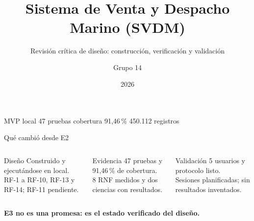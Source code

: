 \documentclass[aspectratio=169,10pt]{beamer}
\title[SVDM -- E3]{Sistema de Venta y Despacho Marino (SVDM)}
\subtitle{Revisión crítica de diseño: construcción, verificación y validación}
\author{Grupo 14}
\institute{Universidad de Concepción}
\date{2026}
\begin{document}
\begin{frame}[plain]
  \titlepage
  \vfill
  \begin{center}
    \small
    MVP local \textbullet{} 47 pruebas \textbullet{} cobertura 91,46\,\% \textbullet{} 450.112 registros
  \end{center}
\end{frame}

\begin{frame}{Qué cambió desde E2}
  \begin{columns}[T,onlytextwidth]
      \begin{block}{Diseño}
        Construido y ejecutándose en local.\\[1mm]
        RF-1 a RF-10, RF-13 y RF-14; RF-11 pendiente.
      \end{block}
      \begin{block}{Evidencia}
        47 pruebas y 91,46\,\% de cobertura.\\[1mm]
        8 RNF medidos y dos ciencias con resultados.
      \end{block}
      \begin{block}{Validación}
        5 usuarios y protocolo listo.\\[1mm]
        Sesiones planificadas; sin resultados inventados.
      \end{block}
  \end{columns}
  \vspace{2mm}
  \begin{center}
    \large\color{GascoBlue}\textbf{E3 no es una promesa: es el estado verificado del diseño.}
  \end{center}
\end{frame}
\end{document}
